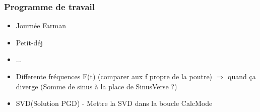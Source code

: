 \documentclass[12pt]{beamer}
\begin{document}
	\begin{frame}
	
		\frametitle{Programme de travail}
		
		\begin{itemize}
			\item Journée Farman
			\item Petit-déj
			\item ...
			\item Differente fréquences F(t) (comparer aux f propre de la poutre) $\Rightarrow$ quand ça diverge
					(Somme de sinus à la place de SinusVerse ?)
			\item SVD(Solution PGD) - Mettre la SVD dans la boucle CalcMode
		\end{itemize}
	
	\end{frame}
%
%
%
%	
%	
%	
%
\end{document}
